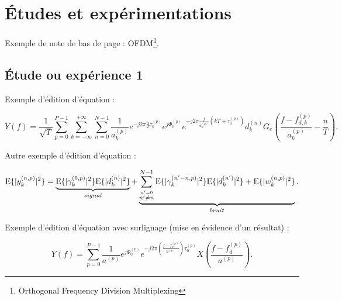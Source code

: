 \documentclass[11pt,a4paper,french]{article}
\begin{document}

\section{Études et expérimentations}\label{sec:S_EXP}

Exemple de note de bas de page : OFDM\footnote{Orthogonal Frequency Division Multiplexing}.

\subsection{Étude ou expérience 1}\label{sec:SS_EXP1}

Exemple d'édition d'équation :

\begin{equation}
\label{E_AA_OFDM_BB_TMD_RX3_FREQ4}
Y(f) = \frac{1}{\sqrt{T}}\sum_{p=0}^{P-1}\sum_{k=-\infty}^{+\infty}\sum_{n=0}^{N-1}\frac{1}{a_k^{(p)}}
       e^{-j 2\pi\frac{n}{T}\tau_0^{(p)}}e^{j\Phi_0^{(p)}}
			 e^{-j2\pi \frac{f}{a_k^{(p)}}(kT+\tau_0^{(p)})}
			 d_k^{(n)}G_e(\frac{f-f_{d,k}^{(p)}}{a_k^{(p)}}-\frac{n}{T}).
\end{equation}

Autre exemple d'édition d'équation :

\begin{equation}
\label{E_RX_DETECT_DP4}
\textup{E}\{|y_k^{(n,p)}|^2\} = \underbrace{\textup{E}\{|\gamma_{k}^{(0, p)}|^2\} \textup{E}\{|d_k^{(n)}|^2\}}_{signal}
+\underbrace{\sum_{\stackrel{n'=0}{n'\neq n}}^{N-1}\textup{E}\{|\gamma_{k}^{(n'-n, p)}|^2\} \textup{E}\{|d_{k}^{(n')}|^2\}
+\textup{E}\{|w_k^{(n,p)}|^2\}}_{bruit}.
\end{equation}

Exemple d'édition d'équation avec surlignage (mise en évidence d'un résultat) :

\begin{shaded}
\begin{equation}
\label{E_SIGN_RX_BB_FREQ}
Y(f) = \sum_{p=0}^{P-1}\frac{1}{a^{(p)}} e^{j\Phi_0^{(p)}}e^{-j2\pi \left(\frac{f-f_d^{(p)}}{a^{(p)}}\right)\tau_0^{(p)}}
X\left(\frac{f-f_d^{(p)}}{a^{(p)}}\right).
\end{equation}
\end{shaded}
\end{document}
